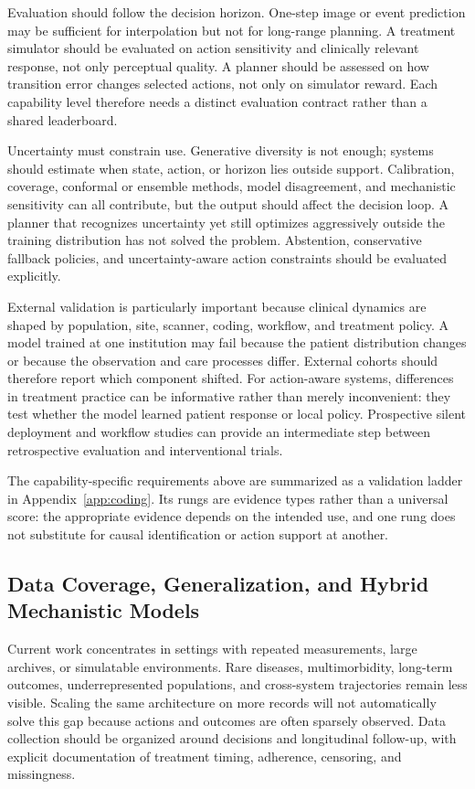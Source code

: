 Evaluation should follow the decision horizon. One-step image or event prediction may be sufficient for interpolation but not for long-range planning. A treatment simulator should be evaluated on action sensitivity and clinically relevant response, not only perceptual quality. A planner should be assessed on how transition error changes selected actions, not only on simulator reward. Each capability level therefore needs a distinct evaluation contract rather than a shared leaderboard.

Uncertainty must constrain use. Generative diversity is not enough; systems should estimate when state, action, or horizon lies outside support. Calibration, coverage, conformal or ensemble methods, model disagreement, and mechanistic sensitivity can all contribute, but the output should affect the decision loop. A planner that recognizes uncertainty yet still optimizes aggressively outside the training distribution has not solved the problem. Abstention, conservative fallback policies, and uncertainty-aware action constraints should be evaluated explicitly.

External validation is particularly important because clinical dynamics are shaped by population, site, scanner, coding, workflow, and treatment policy. A model trained at one institution may fail because the patient distribution changes or because the observation and care processes differ. External cohorts should therefore report which component shifted. For action-aware systems, differences in treatment practice can be informative rather than merely inconvenient: they test whether the model learned patient response or local policy. Prospective silent deployment and workflow studies can provide an intermediate step between retrospective evaluation and interventional trials.

The capability-specific requirements above are summarized as a validation ladder in Appendix~\ref{app:coding}. Its rungs are evidence types rather than a universal score: the appropriate evidence depends on the intended use, and one rung does not substitute for causal identification or action support at another.

\subsection{Data Coverage, Generalization, and Hybrid Mechanistic Models}

Current work concentrates in settings with repeated measurements, large archives, or simulatable environments. Rare diseases, multimorbidity, long-term outcomes, underrepresented populations, and cross-system trajectories remain less visible. Scaling the same architecture on more records will not automatically solve this gap because actions and outcomes are often sparsely observed. Data collection should be organized around decisions and longitudinal follow-up, with explicit documentation of treatment timing, adherence, censoring, and missingness.

